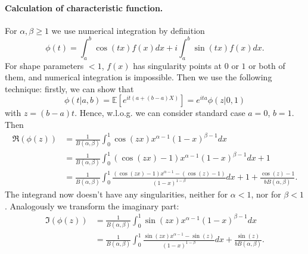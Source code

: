 \documentclass[a4paper,11pt]{article}
\theoremstyle{plain}
\theoremstyle{definition}
\begin{document}
	\paragraph{Calculation of characteristic function.}
	For $\alpha, \beta \geq 1$ we use numerical integration by definition
	\[
	\phi(t) = \int_a^b \cos(tx) f(x) dx + i \int_{a}^{b} \sin(tx) f(x) dx.
	\]
	For shape parameters $<1$, $f(x)$ has singularity points at $0$ or $1$ or both of them, and numerical integration is impossible. Then we use the following technique: firstly, we can show that
	\[
	\phi(t|a, b) = \mathbb{E}[e^{it(a + (b-a)X)}] = e^{ita} \phi(z|0, 1)
	\]
	with $z = (b-a)t$. Hence, w.l.o.g. we can consider standard case $a=0$, $b=1$. Then
	\[
	\begin{aligned}
	\Re(\phi(z)) & = \frac{1}{B(\alpha, \beta)} \int_{0}^{1} \cos(zx) x^{\alpha-1} (1-x)^{\beta-1} dx\\
	& = \frac{1}{B(\alpha, \beta)} \int_{0}^{1} (\cos(zx)-1) x^{\alpha-1} (1-x)^{\beta-1} dx + 1 \\
	& = \frac{1}{B(\alpha, \beta)} \int_{0}^{1} \frac{(\cos(zx)-1) x^{\alpha-1} - (\cos(z)-1)}{(1-x)^{1-\beta}}  dx + 1 + \frac{\cos(z) - 1}{bB(\alpha, \beta)}.
	\end{aligned}
	\]
	The integrand now doesn't have any singularities, neither for $\alpha<1$, nor for $\beta < 1$. Analogously we transform the imaginary part:
	\[
	\begin{aligned}
	\Im(\phi(z)) & = \frac{1}{B(\alpha, \beta)} \int_{0}^{1} \sin(zx) x^{\alpha-1} (1-x)^{\beta-1} dx\\
	& = \frac{1}{B(\alpha, \beta)} \int_{0}^{1} \frac{\sin(zx) x^{\alpha-1} - \sin(z)}{(1-x)^{1-\beta}}  dx + \frac{\sin(z)}{bB(\alpha, \beta)}.
	\end{aligned}
	\]
	
\end{document}
